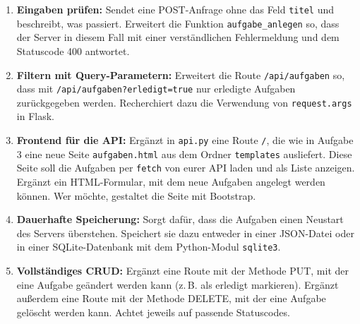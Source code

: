 \documentclass[11pt, a4paper, oneside]{article}
\begin{document}
	\begin{enumerate}[label=\alph*)]
		\item \textbf{Eingaben prüfen:}
		Sendet eine POST-Anfrage ohne das Feld \texttt{titel} und beschreibt, was passiert.
		Erweitert die Funktion \texttt{aufgabe\_anlegen} so, dass der Server in diesem Fall mit einer verständlichen Fehlermeldung und dem Statuscode 400 antwortet.
		\item \textbf{Filtern mit Query-Parametern:}
		Erweitert die Route \lstinline{/api/aufgaben} so, dass mit \lstinline{/api/aufgaben?erledigt=true} nur erledigte Aufgaben zurückgegeben werden.
		Recherchiert dazu die Verwendung von \lstinline{request.args} in Flask.
		\item \textbf{Frontend für die API:}
		Ergänzt in \texttt{api.py} eine Route \texttt{/}, die wie in Aufgabe 3 eine neue Seite \texttt{aufgaben.html} aus dem Ordner \texttt{templates} ausliefert.
		Diese Seite soll die Aufgaben per \texttt{fetch} von eurer API laden und als Liste anzeigen.
		Ergänzt ein HTML-Formular, mit dem neue Aufgaben angelegt werden können.
		Wer möchte, gestaltet die Seite mit Bootstrap.
		\item \textbf{Dauerhafte Speicherung:}
		Sorgt dafür, dass die Aufgaben einen Neustart des Servers überstehen.
		Speichert sie dazu entweder in einer JSON-Datei oder in einer SQLite-Datenbank mit dem Python-Modul \texttt{sqlite3}.
		\item \textbf{Vollständiges CRUD:}
		Ergänzt eine Route mit der Methode PUT, mit der eine Aufgabe geändert werden kann (z.\,B. als erledigt markieren).
		Ergänzt außerdem eine Route mit der Methode DELETE, mit der eine Aufgabe gelöscht werden kann.
		Achtet jeweils auf passende Statuscodes.
	\end{enumerate}
	
\end{document}
